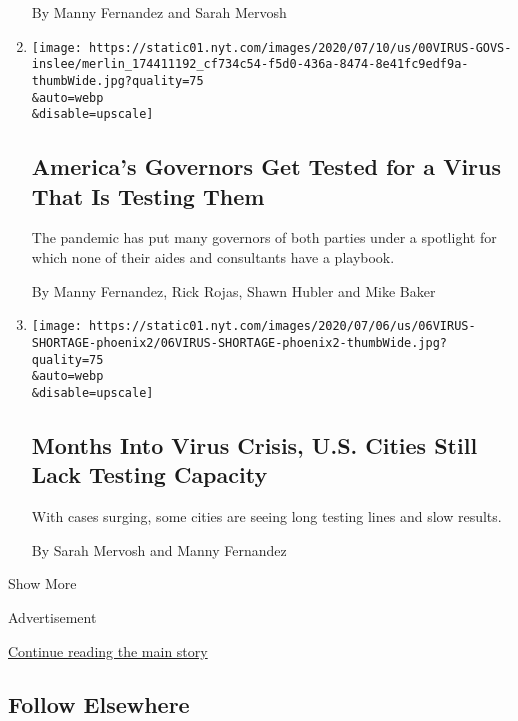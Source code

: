 \begin{enumerate}
  By Manny Fernandez and Sarah Mervosh
\item
  \href{/2020/07/13/us/coronavirus-governors.html}{}

  \texttt{[image: https://static01.nyt.com/images/2020/07/10/us/00VIRUS-GOVS-inslee/merlin\_174411192\_cf734c54-f5d0-436a-8474-8e41fc9edf9a-thumbWide.jpg?quality=75\\\&auto=webp\\\&disable=upscale]}

  \hypertarget{americas-governors-get-tested-for-a-virus-that-is-testing-them}{%
  \subsection{America's Governors Get Tested for a Virus That Is Testing
  Them}\label{americas-governors-get-tested-for-a-virus-that-is-testing-them}}

  The pandemic has put many governors of both parties under a spotlight
  for which none of their aides and consultants have a playbook.

  By Manny Fernandez, Rick Rojas, Shawn Hubler and Mike Baker
\item
  \href{/2020/07/06/us/coronavirus-test-shortage.html}{}

  \texttt{[image: https://static01.nyt.com/images/2020/07/06/us/06VIRUS-SHORTAGE-phoenix2/06VIRUS-SHORTAGE-phoenix2-thumbWide.jpg?quality=75\\\&auto=webp\\\&disable=upscale]}

  \hypertarget{months-into-virus-crisis-us-cities-still-lack-testing-capacity}{%
  \subsection{Months Into Virus Crisis, U.S. Cities Still Lack Testing
  Capacity}\label{months-into-virus-crisis-us-cities-still-lack-testing-capacity}}

  With cases surging, some cities are seeing long testing lines and slow
  results.

  By Sarah Mervosh and Manny Fernandez
\end{enumerate}

Show More

Advertisement

\protect\hyperlink{after-mid2}{Continue reading the main story}

\hypertarget{follow-elsewhere}{%
\subsection{Follow Elsewhere}\label{follow-elsewhere}}

